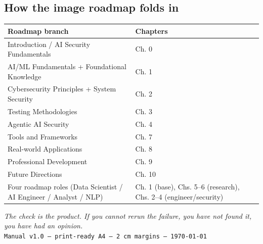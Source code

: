 \subsection*{How the image roadmap folds in}
\begin{center}
\begin{tabularx}{\linewidth}{lX}
\toprule
Roadmap branch & Chapters \\
\midrule
Introduction / AI Security Fundamentals & Ch. 0 \\
AI/ML Fundamentals + Foundational Knowledge & Ch. 1 \\
Cybersecurity Principles + System Security & Ch. 2 \\
Testing Methodologies & Ch. 3 \\
Agentic AI Security & Ch. 4 \\
Tools and Frameworks & Ch. 7 \\
Real-world Applications & Ch. 8 \\
Professional Development & Ch. 9 \\
Future Directions & Ch. 10 \\
Four roadmap roles (Data Scientist / AI Engineer / Analyst / NLP) & Ch. 1 (base), Chs. 5–6 (research), Chs. 2–4 (engineer/security) \\
\bottomrule
\end{tabularx}
\end{center}

\vspace{12pt}
\begin{center}
{\small \itshape The check is the product. If you cannot rerun the failure, you have not found it, you have had an opinion.}\\
\vspace{4pt}
{\footnotesize \texttt{Manual v1.0 — print-ready A4 — 2\,cm margins — \today}}
\end{center}
